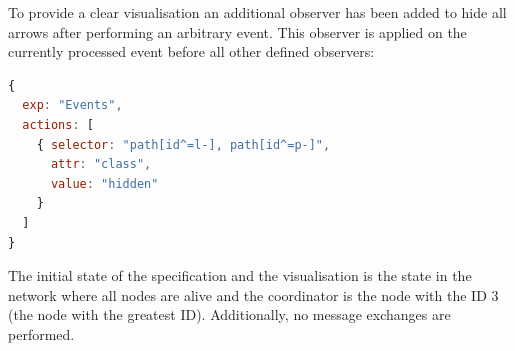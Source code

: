 To provide a clear visualisation an additional observer has been added to hide all arrows after performing an arbitrary event.
This observer is applied on the currently processed event before all other defined observers:

\begin{lstlisting}[language=JavaScript]
{
  exp: "Events",
  actions: [
    { selector: "path[id^=l-], path[id^=p-]", 
      attr: "class", 
      value: "hidden"
    }
  ]
}
\end{lstlisting}
 
The initial state of the specification and the visualisation is the state in the network where all nodes are alive and the coordinator is the node with the ID 3 (the node with the greatest ID). 
Additionally, no message exchanges are performed.